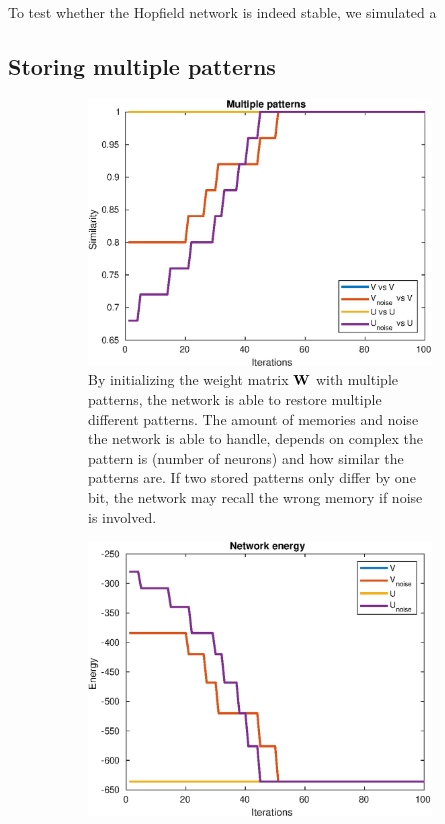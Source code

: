 To test whether the Hopfield network is indeed stable, we simulated a 

\subsection{Storing multiple patterns}
\begin{figure}[H]
    \centering
    \begin{subfigure}{0.49\textwidth}
        \includegraphics[width=\textwidth]{figs/multiple-patterns.eps}
        \caption{By initializing the weight matrix $\bf W$ with multiple patterns, the network is able to restore multiple different patterns. The amount of memories and noise the network is able to handle, depends on complex the pattern is (number of neurons) and how similar the patterns are. If two stored patterns only differ by one bit, the network may recall the wrong memory if noise is involved. }
    \end{subfigure}
    \begin{subfigure}{0.49\textwidth}
        \includegraphics[width=\textwidth]{figs/multiple-patterns-energy.eps}

\end{subfigure}
\end{figure}
